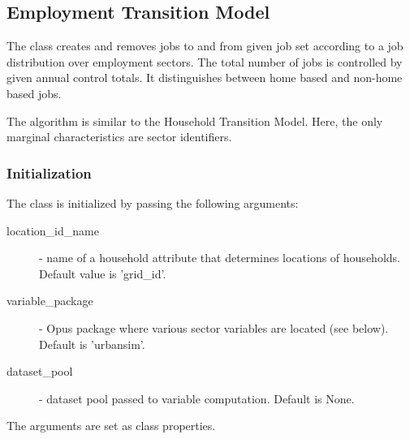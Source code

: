 %
\subsection{Employment Transition Model}
\modelsindex
%
\label{sec:employment-transition-model}

The class  \modelsindex creates and removes jobs to and
from given job set according to a job distribution over employment sectors.
The total number of jobs is controlled by given annual control totals. It
distinguishes between home based and non-home based jobs.

The algorithm is similar to the Household Transition Model. \modelsindex 
Here, the only marginal characteristics are sector
identifiers.

\subsubsection{Initialization}
%
The class is initialized by passing the following arguments:
\begin{description}
\item[location_id_name] - name of a household attribute that determines locations of households.
  Default value is 'grid_id'.
\item[variable_package] - Opus package where various sector variables are located (see below). 
  Default is 'urbansim'.
\item[dataset_pool] - dataset pool passed to variable computation. Default is None. 
\end{description}
The arguments are set as class properties.
